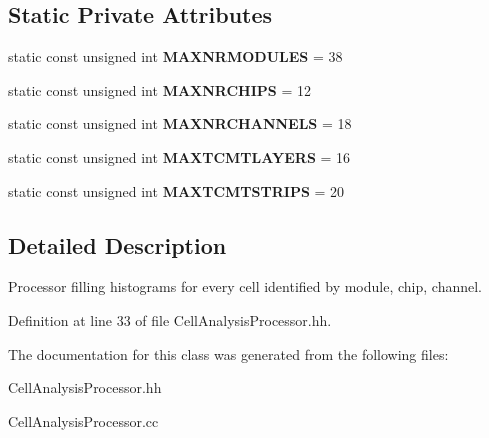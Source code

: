 \subsection*{Static Private Attributes}
\begin{DoxyCompactItemize}
\item 
static const unsigned int {\bfseries MAXNRMODULES} = 38\label{classCellAnalysisProcessor_a2dfcec3ca068b0f9a2855d5e20985150}

\item 
static const unsigned int {\bfseries MAXNRCHIPS} = 12\label{classCellAnalysisProcessor_a7d6d32672684ef32a52ab06fd81a180b}

\item 
static const unsigned int {\bfseries MAXNRCHANNELS} = 18\label{classCellAnalysisProcessor_a40721bcdbc533caa0e84417544e7a43c}

\item 
static const unsigned int {\bfseries MAXTCMTLAYERS} = 16\label{classCellAnalysisProcessor_aafc3097ebf7f58966a5e5b2ec122ccba}

\item 
static const unsigned int {\bfseries MAXTCMTSTRIPS} = 20\label{classCellAnalysisProcessor_a276eab4e0cd0901968f659a727dd18a0}

\end{DoxyCompactItemize}


\subsection{Detailed Description}
Processor filling histograms for every cell identified by module, chip, channel. 

Definition at line 33 of file CellAnalysisProcessor.hh.

The documentation for this class was generated from the following files:\begin{DoxyCompactItemize}
\item 
CellAnalysisProcessor.hh\item 
CellAnalysisProcessor.cc\end{DoxyCompactItemize}
